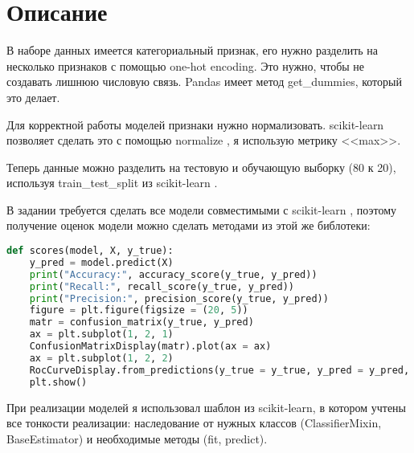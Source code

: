 \section{Описание}
В наборе данных имеется категориальный признак, его нужно разделить на несколько признаков с помощью one-hot encoding. Это нужно, чтобы не создавать лишнюю числовую связь. Pandas имеет метод get\_dummies, который это делает.

Для корректной работы моделей признаки нужно нормализовать. scikit-learn позволяет сделать это с помощью normalize \cite{scikit-normalize}, я использую метрику <<max>>.

Теперь данные можно разделить на тестовую и обучающую выборку (80 к 20), используя train\_test\_split из scikit-learn \cite{scikit-split}.

В задании требуется сделать все модели совместимыми с scikit-learn \cite{scikit-develop}, поэтому получение оценок модели \cite{ml-metrics} можно сделать методами из этой же библотеки:
\begin{lstlisting}[language=Python]
def scores(model, X, y_true):
    y_pred = model.predict(X)
    print("Accuracy:", accuracy_score(y_true, y_pred))
    print("Recall:", recall_score(y_true, y_pred))
    print("Precision:", precision_score(y_true, y_pred))
    figure = plt.figure(figsize = (20, 5))
    matr = confusion_matrix(y_true, y_pred)
    ax = plt.subplot(1, 2, 1)
    ConfusionMatrixDisplay(matr).plot(ax = ax)
    ax = plt.subplot(1, 2, 2)
    RocCurveDisplay.from_predictions(y_true = y_true, y_pred = y_pred, name = "ROC-curve", ax = ax)
    plt.show()
\end{lstlisting}

При реализации моделей я использовал шаблон \cite{scikit-github} из scikit-learn, в котором учтены все тонкости реализации: наследование от нужных классов (ClassifierMixin, BaseEstimator) и необходимые методы (fit, predict).
\pagebreak

